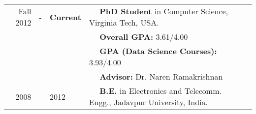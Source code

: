 
  \tabcolsep=0.11cm
  \begin{tabular}{rclll}
    Fall 2012 & - &{\bf Current} & $\quad$ {\bf PhD Student} in Computer Science, Virginia Tech, USA. \\
                & & & $\quad$ \textbf{Overall GPA:} 3.61/4.00\\
                & & & $\quad$ \textbf{GPA (Data Science Courses):} 3.93/4.00\\
                & & & $\quad$ \textbf{Advisor:} Dr. Naren Ramakrishnan \\
    2008 & - & 2012 & $\quad$ {\bf B.E.} in Electronics and Telecomm. Engg., Jadavpur University, India. \\
  \end{tabular}

